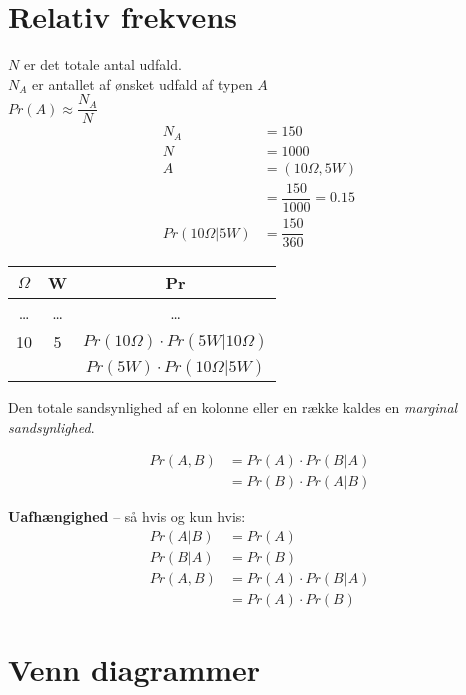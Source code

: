 \documentclass[Main]{subfiles}
\begin{document}
\section{Relativ frekvens}
$N$ er det totale antal udfald.
\\
$N_A$ er antallet af ønsket udfald af typen $A$
\\
$Pr(A) \approx \dfrac{N_A}{N}$
\begin{align*}
N_A &= 150\\
N &= 1000 \\
A &= (10 \Omega, 5 W)\\
	&= \dfrac{150}{1000} = 0.15\\
Pr(10 \Omega | 5W) &= \dfrac{150}{360}
\end{align*}

\begin{table}[H]
\begin{tabular}{ccc}
$\Omega$ & W & Pr \\ \hline
\dots	&\dots	&\dots	\\
10 & 5 & $Pr(10 \Omega) \cdot Pr(5 W | 10 \Omega)$\\
& & $Pr(5 W) \cdot Pr(10 \Omega | 5 W)$\\
\end{tabular}
\end{table}

Den totale sandsynlighed af en kolonne eller en række kaldes en \textit{marginal sandsynlighed}.

\begin{align*}
Pr(A,B) &= Pr(A) \cdot Pr(B|A)\\
	&= Pr(B)\cdot Pr(A|B)
\end{align*}

\textbf{Uafhængighed} -- så hvis og kun hvis:
\begin{align*}
Pr(A|B) &= Pr(A)\\
Pr(B|A) &= Pr(B)\\
Pr(A, B) &= Pr(A)\cdot Pr(B|A)\\
	&= Pr(A) \cdot Pr(B)
\end{align*}

\section{Venn diagrammer}
\end{document}

